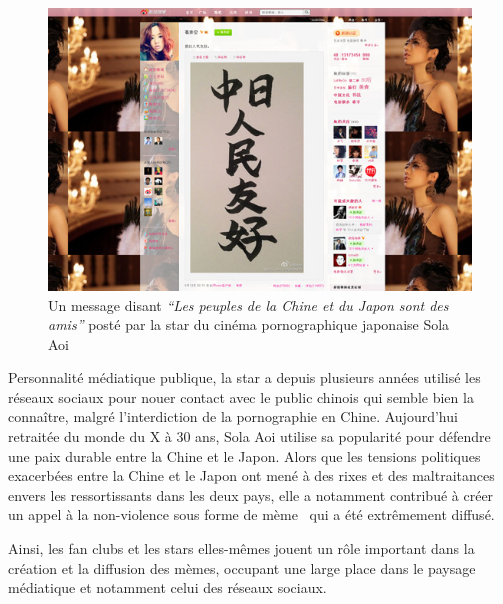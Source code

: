 \begin{description}
\begin{figure}[b]
    \centering
    \includegraphics[scale=0.7]{figures/chap2/chapitre2-img22.jpg}
    \caption[La star du X japonaise Sola Aoi sur Sina Weibo]{Un message disant\textit{ {\textquotedblleft}Les peuples de la Chine et du Japon sont des amis{\textquotedblright} }post\'e par la star du cinéma pornographique japonaise Sola Aoi}
    \label{fig:pornstar-weibo}
\end{figure}

Personnalit\'e m\'ediatique publique, la star a depuis plusieurs ann\'ees utilis\'e les r\'eseaux sociaux pour nouer contact avec le public chinois qui semble bien la conna\^itre, malgr\'e l{\textquoteright}interdiction de la pornographie en Chine. Aujourd{\textquoteright}hui retrait\'ee du monde du X \`a 30 ans, Sola Aoi utilise sa popularit\'e pour d\'efendre une paix durable entre la Chine et le Japon. Alors que les tensions politiques exacerb\'ees entre la Chine et le Japon ont men\'e \`a des rixes et des maltraitances envers les ressortissants dans les deux pays, elle a notamment contribu\'e \`a cr\'eer un appel \`a la non-violence sous forme de m\`eme \ qui a \'et\'e extr\^emement diffus\'e.  


Ainsi, les fan clubs et les stars elles-m\^emes jouent un r\^ole important dans la cr\'eation et la diffusion des m\`emes, occupant une large place dans le paysage m\'ediatique et notamment celui des r\'eseaux sociaux. 



\end{description}
